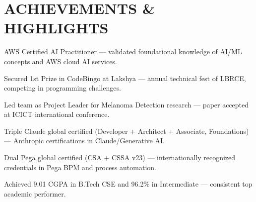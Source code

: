 \documentclass[10pt]{article}
\begin{document}
\section{ACHIEVEMENTS \& HIGHLIGHTS}
\begin{tightitemize}
\item AWS Certified AI Practitioner — validated foundational knowledge of AI/ML concepts and AWS cloud AI services.
\item Secured 1st Prize in CodeBingo at Lakshya — annual technical fest of LBRCE, competing in programming challenges.
\item Led team as Project Leader for Melanoma Detection research — paper accepted at ICICT international conference.
\item Triple Claude global certified (Developer + Architect + Associate, Foundations) — Anthropic certifications in Claude/Generative AI.
\item Dual Pega global certified (CSA + CSSA v23) — internationally recognized credentials in Pega BPM and process automation.
\item Achieved 9.01 CGPA in B.Tech CSE and 96.2\% in Intermediate — consistent top academic performer.
\end{tightitemize}
\end{document}
